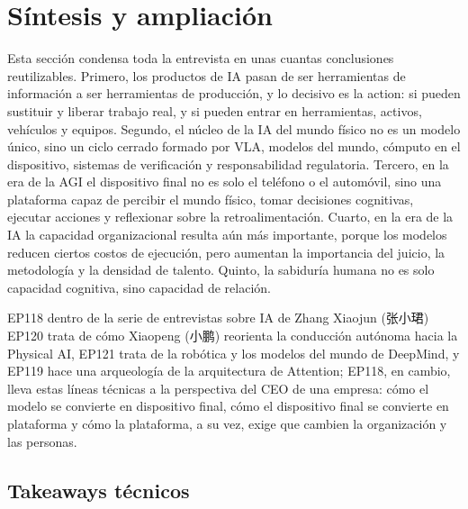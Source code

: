 \section{Síntesis y ampliación}

Esta sección condensa toda la entrevista en unas cuantas conclusiones reutilizables. Primero, los productos de IA pasan de ser herramientas de información a ser herramientas de producción, y lo decisivo es la action: si pueden sustituir y liberar trabajo real, y si pueden entrar en herramientas, activos, vehículos y equipos. Segundo, el núcleo de la IA del mundo físico no es un modelo único, sino un ciclo cerrado formado por VLA, modelos del mundo, cómputo en el dispositivo, sistemas de verificación y responsabilidad regulatoria. Tercero, en la era de la AGI el dispositivo final no es solo el teléfono o el automóvil, sino una plataforma capaz de percibir el mundo físico, tomar decisiones cognitivas, ejecutar acciones y reflexionar sobre la retroalimentación. Cuarto, en la era de la IA la capacidad organizacional resulta aún más importante, porque los modelos reducen ciertos costos de ejecución, pero aumentan la importancia del juicio, la metodología y la densidad de talento. Quinto, la sabiduría humana no es solo capacidad cognitiva, sino capacidad de relación.

\begin{importantbox}{EP118 dentro de la serie de entrevistas sobre IA de Zhang Xiaojun (张小珺)}
EP120 trata de cómo Xiaopeng (小鹏) reorienta la conducción autónoma hacia la Physical AI, EP121 trata de la robótica y los modelos del mundo de DeepMind, y EP119 hace una arqueología de la arquitectura de Attention; EP118, en cambio, lleva estas líneas técnicas a la perspectiva del CEO de una empresa: cómo el modelo se convierte en dispositivo final, cómo el dispositivo final se convierte en plataforma y cómo la plataforma, a su vez, exige que cambien la organización y las personas.
\end{importantbox}

\subsection{Takeaways técnicos}

